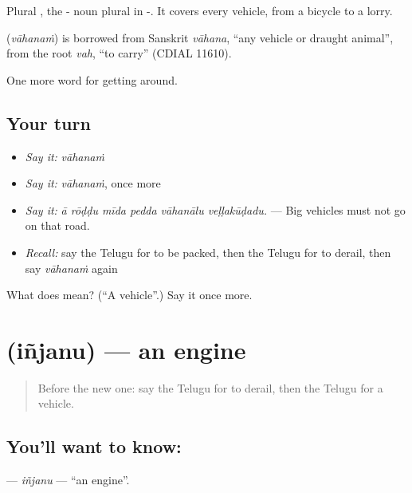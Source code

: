 Plural , the - noun plural in -. It covers every vehicle, from a bicycle to a lorry.

\begin{cousinweb}
\textbf{} (\emph{vāhanaṁ}) is borrowed from Sanskrit \emph{vāhana}, \textquotedblleft{}any vehicle or draught animal\textquotedblright{}, from the root \emph{vah}, \textquotedblleft{}to carry\textquotedblright{} (CDIAL 11610).
\end{cousinweb}

\begin{grammarlens}[title={What you've built}]
One more word for getting around.
\end{grammarlens}

\subsection*{Your turn}
\begin{itemize}
\raggedright
  \item \emph{Say it:} \emph{vāhanaṁ}
  \item \emph{Say it:} \emph{vāhanaṁ}, once more
  \item \emph{Say it:} \emph{ā rōḍḍu mīda pedda vāhanālu veḷḷakūḍadu.} — Big vehicles must not go on that road.
  \item \emph{Recall:} say the Telugu for to be packed, then the Telugu for to derail, then say \emph{vāhanaṁ} again
\end{itemize}

\begin{tcolorbox}[breakable,colback=teal!4,colframe=teal!35!black,title={Before you move on}]
What does  mean? (\textquotedblleft{}A vehicle\textquotedblright{}.) Say it once more.
\end{tcolorbox}
\section[\texorpdfstring{\te{ఇంజను} (iñjanu)}{ఇంజను (iñjanu)}]{ (iñjanu) — an engine}

\label{lesson:TE-C443-injanu}



\begin{quote}
Before the new one: say the Telugu for to derail, then the Telugu for a vehicle.
\end{quote}

\subsection*{You'll want to know: }
\textbf{} — \emph{iñjanu} — \textquotedblleft{}an engine\textquotedblright{}.

